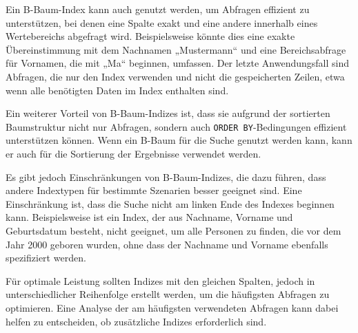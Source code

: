 Ein B-Baum-Index kann auch genutzt werden, um Abfragen effizient zu unterstützen, bei denen eine Spalte exakt und eine andere innerhalb eines Wertebereichs abgefragt wird.
Beispielsweise könnte dies eine exakte Übereinstimmung mit dem Nachnamen „Mustermann“ und eine Bereichsabfrage für Vornamen, die mit „Ma“ beginnen, umfassen.
Der letzte Anwendungsfall sind Abfragen, die nur den Index verwenden und nicht die gespeicherten Zeilen, etwa wenn alle benötigten Daten im Index enthalten sind.

Ein weiterer Vorteil von B-Baum-Indizes ist, dass sie aufgrund der sortierten Baumstruktur nicht nur Abfragen, sondern auch \texttt{ORDER BY}-Bedingungen effizient unterstützen können.
Wenn ein B-Baum für die Suche genutzt werden kann, kann er auch für die Sortierung der Ergebnisse verwendet werden.

Es gibt jedoch Einschränkungen von B-Baum-Indizes, die dazu führen, dass andere Indextypen für bestimmte Szenarien besser geeignet sind.
Eine Einschränkung ist, dass die Suche nicht am linken Ende des Indexes beginnen kann.
Beispielsweise ist ein Index, der aus Nachname, Vorname und Geburtsdatum besteht, nicht geeignet, um alle Personen zu finden, die vor dem Jahr 2000 geboren wurden, ohne dass der Nachname und Vorname ebenfalls spezifiziert werden.

Für optimale Leistung sollten Indizes mit den gleichen Spalten, jedoch in unterschiedlicher Reihenfolge erstellt werden, um die häufigsten Abfragen zu optimieren.
Eine Analyse der am häufigsten verwendeten Abfragen kann dabei helfen zu entscheiden, ob zusätzliche Indizes erforderlich sind.


